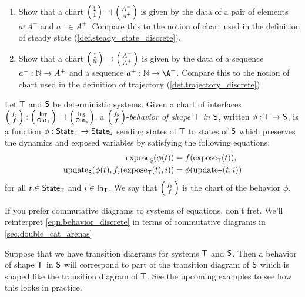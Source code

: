 \documentclass[DynamicalBook]{subfiles}
\begin{document}
\begin{exercise}
  \begin{enumerate}
    \item Show that a chart $\lens{\ord{1}}{\ord{1}} \rightrightarrows
      \lens{A^-}{A^+}$ is given by the data of a pair of elements $a^_ \in A^-$
      and $a^+ \in A^+$. Compare this to the notion of chart used in the
      definition of steady state (\cref{def.steady_state_discrete}).
     \item Show that a chart $\lens{\ord{1}}{\nn} \rightrightarrows
       \lens{A^-}{A^+}$ is given by the data of a sequence $a^- : \mathbb{N} \to A^+$
       and a sequence $a^+ : \nn \to \A^+$. Compare this to the notion of chart
       used in the definition of trajectory (\cref{def.trajectory_discrete})
  \end{enumerate}
\end{exercise}




\begin{definition} \label{def.behavior_discrete}
  Let $\mathsf{T}$ and $\mathsf{S}$ be deterministic systems. Given a chart of interfaces $\lens{f_{\flat}}{f}:
  \lens{\In{T}}{\Out{T}} \rightrightarrows \lens{\In{S}}{\Out{S}}$, a $\lens{f_{\flat}}{f}$-\emph{behavior of
  shape $\mathsf{T}$ in $\mathsf{S}$}, written
 $\phi :
\mathsf{T} \to \mathsf{S}$, is a function $\phi : \mathsf{State}_{\mathsf{T}} \to \mathsf{State}_{\mathsf{S}}$ sending
states of $\mathsf{T}$ to states of $\mathsf{S}$ which preserves the dynamics and
exposed variables by satisfying the following equations:
\begin{equation}\label{eqn.behavior_discrete}
\begin{aligned}
  \mathrm{expose}_{\mathsf{S}}(\phi(t)) &= f(\mathrm{expose}_{\mathsf{T}}(t)), \\
  \mathrm{update}_{\mathsf{S}}(\phi(t), f_{\flat}(\mathrm{expose}_{\mathsf{T}}(t), i)) &= \phi(\mathrm{update}_{\mathsf{T}}(t, i))
\end{aligned}
\end{equation}
for all $t \in \mathsf{State}_{\mathsf{T}}$ and $i \in \mathsf{In}_{\mathsf{T}}$. We say that $\lens{f_{\flat}}{f}$
is the chart of the behavior $\phi$.
\end{definition}

\begin{remark}
  If you prefer commutative diagrams to systems of equations, don't fret. We'll
  reinterpret \cref{eqn.behavior_discrete} in terms of commutative diagrams in \cref{sec.double_cat_arenas}
\end{remark}

\begin{remark}
  Suppose that we have transition diagrams for systems $\mathsf{T}$ and $\mathsf{S}$.
  Then a behavior of shape $\mathsf{T}$ in $\mathsf{S}$ will correspond to part of the
  transition diagram of $\mathsf{S}$ which is shaped like the transition diagram of
  $\mathsf{T}$. See the upcoming examples to see how this looks in practice.
\end{remark}
\end{document}
